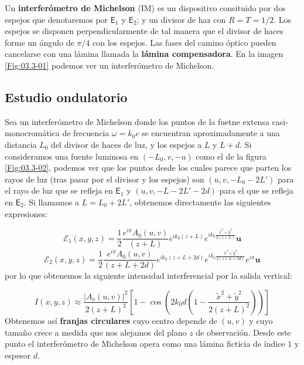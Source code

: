 \documentclass[12pt,a4paper]{book}
\numberwithin{equation}{section}
\numberwithin{figure}{section}
\newcommand{\parentesis}[1]{\left( #1  \right)}
\newcommand{\ccorchetes}[1]{\left[ #1  \right]}
\newcommand{\1}{_{(1)}}
\newcommand{\2}{_{(2)}}
\newcommand{\un}{\mathbf{u}}
\newcommand{\Encal}{\boldsymbol{\mathcal{E}}}
\theoremstyle{definition}
\begin{document}
Un \textbf{interferómetro de Michelson} (IM) es un dispositivo consituido por dos espejos que denotaremos por $\mathsf{E}_1$ y $\mathsf{E}_2$; y un divisor de haz con $R=T=1/2$. Los espejos se disponen perpendicularmente de tal manera que el divisor de haces forme un ángulo de $\pi/4$ con los espejos. Las fases del camino óptico pueden cancelarse con una lámina llamada la \textbf{lámina compensadora}. En la imagen \ref{Fig:03.3-01} podemos ver un interferómetro de Michelson.

\subsection{Estudio ondulatorio}

Sea un interferómetro de Michelson donde los puntos de la fuetne extensa casi-monocromática de frecuencia $\omega=k_0c$ se encuentran aproximadamente a una distancia $L_0$ del divisor de haces de luz, y los espejos a $L$ y $L+d$. Si consideramos una fuente luminosa en $(-L_0,v,-u)$ como el de la figura  \ref{Fig:03.3-02}, podemos ver que los puntos desde los cuales parece que parten los rayos de luz (tras pasar por el divisor y los espejos) son $(u,v,-L_0-2L')$ para el rayo de luz que se refleja en $\mathsf{E}_1$ y $(u,v,-L-2L'-2d)$ para el que se refleja en $\mathsf{E}_2$. Si llamamos a $L=L_0+2L'$, obtenemos directamente las siguientes expresiones:

\begin{equation}
\Encal_1(x,y,z) = \frac{1}{2} \frac{e^{i\pi} A_0(u,v)}{(z+L)} e^{ik_0 (z+L)} e^{ik_0 \frac{\tilde{x}^2+\tilde{y}^2}{2(z+L)}} \un
\end{equation}
\begin{equation}
\Encal_2(x,y,z) = \frac{1}{2} \frac{e^{i\pi} A_0(u,v)}{(z+L+2d)} e^{ik_0 (z+L+2d)} e^{ik_0 \frac{\tilde{x}^2+\tilde{y}^2}{2(z+L+2d)}} e^{i\pi} \un
\end{equation}
por lo que obtenemos la siguiente intensidad interferencial por la salida vertical:

\begin{equation}
I(x,y,z) \approx \frac{|A_o(u,v)|^2}{2(z+L)^2} \ccorchetes{1- \cos \parentesis{2k_0d \parentesis{1-\frac{\tilde{x}^2+\tilde{y}^2}{2(z+L)^2}}}}
\label{Ec:03.3-36}
\end{equation}
Obtenemos así \textbf{franjas circulares} cuyo centro depende de $(u,v)$ y  cuyo tamaño crece a medida que nos alejamos del plano $z$ de observación. Desde este punto el interferómetro de Michelson opera como una lámina ficticia de índice $1$ y espesor $d$. 
\end{document}
